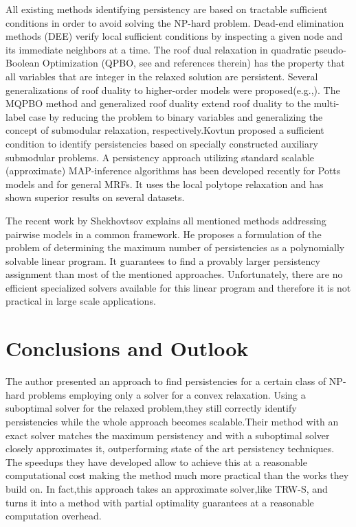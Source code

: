 \documentclass[10pt,twocolumn,letterpaper]{article}
\begin{document}
All existing methods identifying persistency are based on tractable sufficient conditions in order to avoid solving the NP-hard problem. Dead-end elimination methods (DEE)\cite{Desmet1992The} verify local sufficient conditions by inspecting a given node and its immediate neighbors at a time. The roof dual relaxation in quadratic pseudo-Boolean Optimization (QPBO, see and references therein) has the property that all variables that are integer in the relaxed solution are persistent. Several generalizations of roof duality to higher-order models were proposed(e.g.,). The MQPBO method and generalized roof duality extend roof duality to the multi-label case by reducing the problem to binary variables and generalizing
the concept of submodular relaxation, respectively.Kovtun proposed a sufficient condition to identify persistencies based on specially constructed auxiliary submodular problems. A persistency approach utilizing standard scalable (approximate) MAP-inference algorithms has been
developed recently for Potts models and for general MRFs. It uses the local polytope relaxation and has shown superior results on several datasets.

The recent work by Shekhovtsov\cite{Shekhovtsov2014Maximum} explains all mentioned methods addressing pairwise models in a common framework. He proposes a formulation of the problem of determining the maximum number of persistencies as a polynomially solvable linear program. It guarantees to find a provably larger persistency assignment than most of the mentioned approaches. Unfortunately, there are no efficient specialized solvers available for this linear program and therefore it is not practical in large scale applications.
\section{Conclusions and Outlook}
The author presented an approach to find persistencies for a certain class of NP-hard problems employing only a solver for a convex relaxation. Using a suboptimal solver for the relaxed problem,they still correctly identify persistencies while the whole approach becomes scalable.Their
method with an exact solver matches the maximum persistency and with a suboptimal solver closely approximates it, outperforming state of the art persistency techniques. The speedups they have developed allow to achieve this at a reasonable computational cost making the method much more practical than the works they build on. In fact,this approach takes an approximate solver,like TRW-S, and turns it into a method with partial optimality guarantees at a reasonable computation overhead.
{\small


}
\end{document}
